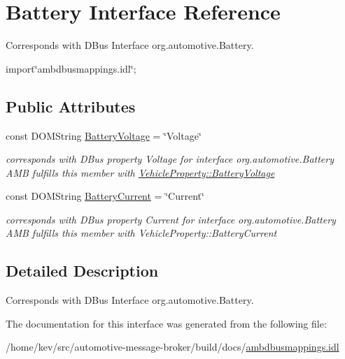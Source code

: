 \hypertarget{interfaceBattery}{\section{Battery Interface Reference}
\label{interfaceBattery}
}


Corresponds with D\+Bus Interface org.\+automotive.\+Battery.  




{\ttfamily import\char`\"{}ambdbusmappings.\+idl\char`\"{};}

\subsection*{Public Attributes}
\begin{DoxyCompactItemize}
\item 
\hypertarget{interfaceBattery_a2456b1f2d089f79ba7d9c2ed8f5e43fd}{const D\+O\+M\+String \hyperlink{interfaceBattery_a2456b1f2d089f79ba7d9c2ed8f5e43fd}{Battery\+Voltage} = \char`\"{}Voltage\char`\"{}}\label{interfaceBattery_a2456b1f2d089f79ba7d9c2ed8f5e43fd}

\begin{DoxyCompactList}\small\item\em corresponds with D\+Bus property Voltage for interface org.\+automotive.\+Battery A\+M\+B fulfills this member with \hyperlink{classVehicleProperty_a43a70a277b955ae35a9ba795d2052591}{Vehicle\+Property\+::\+Battery\+Voltage} \end{DoxyCompactList}\item 
\hypertarget{interfaceBattery_a7917b13d651f01d4c746404a3db3ae11}{const D\+O\+M\+String \hyperlink{interfaceBattery_a7917b13d651f01d4c746404a3db3ae11}{Battery\+Current} = \char`\"{}Current\char`\"{}}\label{interfaceBattery_a7917b13d651f01d4c746404a3db3ae11}

\begin{DoxyCompactList}\small\item\em corresponds with D\+Bus property Current for interface org.\+automotive.\+Battery A\+M\+B fulfills this member with Vehicle\+Property\+::\+Battery\+Current \end{DoxyCompactList}\end{DoxyCompactItemize}


\subsection{Detailed Description}
Corresponds with D\+Bus Interface org.\+automotive.\+Battery. 

The documentation for this interface was generated from the following file\+:\begin{DoxyCompactItemize}
\item 
/home/kev/src/automotive-\/message-\/broker/build/docs/\hyperlink{ambdbusmappings_8idl}{ambdbusmappings.\+idl}\end{DoxyCompactItemize}
